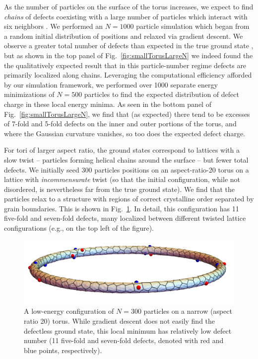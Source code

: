 \documentclass[preprint,12pt]{elsarticle}
\begin{document}
As the number of particles on the surface of the torus increases, we expect to find \emph{chains} of defects coexisting with a large number of particles which interact with six neighbors \cite{giomi2008elastic}. We performed an $N=1000$ particle simulation which began from a random initial distribution of positions and relaxed via gradient descent. We observe a greater total number of defects than expected in the true ground state \cite{giomi2008elastic}, but as shown in the top panel of Fig.~\ref{fig:smallTorusLargeN} we indeed found the the qualitatively expected result that in this particle-number regime defects are primarily localized along chains. Leveraging the computational efficiency afforded by our simulation framework, we performed over 1000 separate energy minimizations of $N=500$ particles to find the expected distribution of defect charge in these local energy minima. As seen in the bottom panel of Fig.~\ref{fig:smallTorusLargeN}, we find that (as expected) there tend to be excesses of 7-fold and 5-fold defects on the inner and outer portions of the torus, and where the Gaussian curvature vanishes, so too does the expected defect charge.


For tori of larger aspect ratio, the ground states correspond to lattices with a slow twist -- particles forming helical chains around the surface -- but fewer total defects. We initially seed 300 particles positions on an aspect-ratio-20 torus on a lattice with \emph{incommensurate} twist (so that the initial configuration, while not disordered, is nevertheless far from the true ground state). We find that the particles relax to a structure with regions of correct crystalline order separated by grain boundaries. This is shown in Fig.~\ref{fig:largeTorusConfigurationComparison}. 
In detail, this configuration has 11 five-fold and seven-fold defects, many localized between different twisted lattice configurations (e.g., on the top left of the figure).

\begin{figure}[htb!]
\centering
\includegraphics[width=1\columnwidth]{300_big_particle_voronoi_points.pdf}
\caption{A low-energy configuration of $N=300$ particles on a narrow (aspect ratio 20) torus. While gradient descent does not easily find the defectless ground state, this local minimum has relatively low defect number (11 five-fold and seven-fold defects, denoted with red and blue points, respectively).}
\label{fig:largeTorusConfigurationComparison}
\end{figure}
\end{document}
